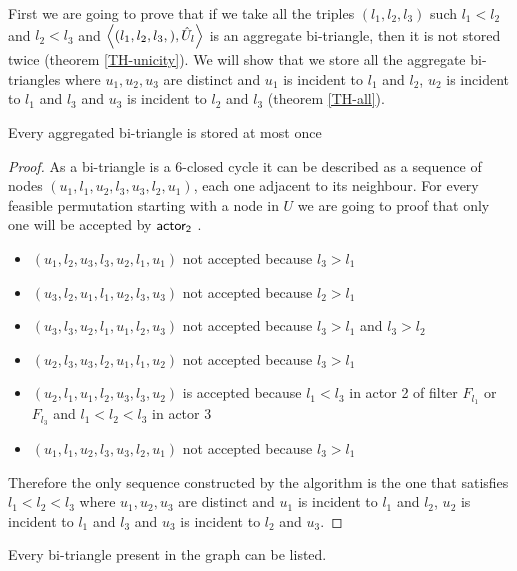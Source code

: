 First we are going to prove that if we take all the triples $(l_1,l_2,l_3)$  such $l_1<l_2$ and $l_2<l_3$  and  $\left\langle (l_1,l_2,l_3,), \hat{U}_l \right\rangle$ is an aggregate  bi-triangle, then it is not stored twice (theorem \ref{TH-unicity}). 
We will show that we store all the aggregate bi-triangles where $u_1,u_2,u_3$  are distinct and $u_1$ is incident to $l_1$ and $l_2$, $u_2$ is incident to $l_1$ and $l_3$ and $u_3$ is incident to $l_2$ and $l_3$ (theorem \ref{TH-all}). 
\begin{theorem} \label{TH-unicity}Every aggregated bi-triangle is stored  at most once 

\end{theorem}
\begin{proof}
As a bi-triangle is a 6-closed cycle it can be described as a sequence of nodes  $(u_1,l_1,u_2,l_3,u_3,l_2,u_1)$, each one adjacent to its neighbour. For every feasible permutation  starting with a node in $U$ we are going to proof that only one will be accepted by $\mathsf{actor_2}$ .  
\begin{itemize}
      \item $(u_1,l_2,u_3,l_3,u_2,l_1,u_1)$ not accepted because $l_3 > l_1$
      \item $(u_3,l_2,u_1,l_1,u_2,l_3,u_3)$ not accepted because $l_2 > l_1$
      \item $(u_3,l_3,u_2,l_1,u_1,l_2,u_3)$ not accepted because $l_3 > l_1$ and $l_3 > l_2$
      \item $(u_2,l_3,u_3,l_2,u_1,l_1,u_2)$ not accepted because $l_3 > l_1 $
      \item $(u_2,l_1,u_1,l_2,u_3,l_3,u_2)$ is accepted because $l_1 < l_3 $ in actor 2 of filter $F_{l_1}$ or $F_{l_3}$ and $l_1 < l_2 <l_3$  in actor 3
      \item $(u_1, l_1,u_2,l_3,u_3,l_2,u_1)$ not accepted because $l_3 > l_1$
\end{itemize}


Therefore the  only sequence constructed by the algorithm is the one that satisfies $l_1 < l_2 < l_3$ where $u_1,u_2,u_3$  are distinct and $u_1$ is incident to $l_1$ and $l_2$, $u_2$ is incident to $l_1$ and $l_3$ and $u_3$ is incident to $l_2$ and $u_3$.
\end{proof}


\begin{theorem}\label{TH-all}Every bi-triangle present in the graph can be  listed.

\end{theorem}

